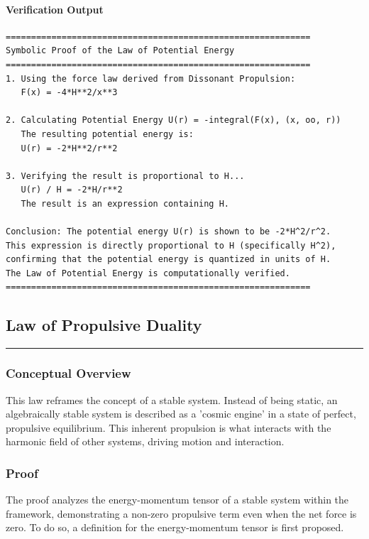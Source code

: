 \paragraph{Verification Output}
\begin{verbatim}
============================================================
Symbolic Proof of the Law of Potential Energy
============================================================
1. Using the force law derived from Dissonant Propulsion:
   F(x) = -4*H**2/x**3

2. Calculating Potential Energy U(r) = -integral(F(x), (x, oo, r))
   The resulting potential energy is:
   U(r) = -2*H**2/r**2

3. Verifying the result is proportional to H...
   U(r) / H = -2*H/r**2
   The result is an expression containing H.

Conclusion: The potential energy U(r) is shown to be -2*H^2/r^2.
This expression is directly proportional to H (specifically H^2),
confirming that the potential energy is quantized in units of H.
The Law of Potential Energy is computationally verified.
============================================================
\end{verbatim}


\subsection*{Law of Propulsive Duality}
\hrule
\vspace{0.3cm}
\vspace{0.5cm}

\subsubsection*{Conceptual Overview}
This law reframes the concept of a stable system. Instead of being static, an algebraically stable system is described as a 'cosmic engine' in a state of perfect, propulsive equilibrium. This inherent propulsion is what interacts with the harmonic field of other systems, driving motion and interaction.

\subsubsection*{Proof}
The proof analyzes the energy-momentum tensor of a stable system within the framework, demonstrating a non-zero propulsive term even when the net force is zero. To do so, a definition for the energy-momentum tensor is first proposed.

